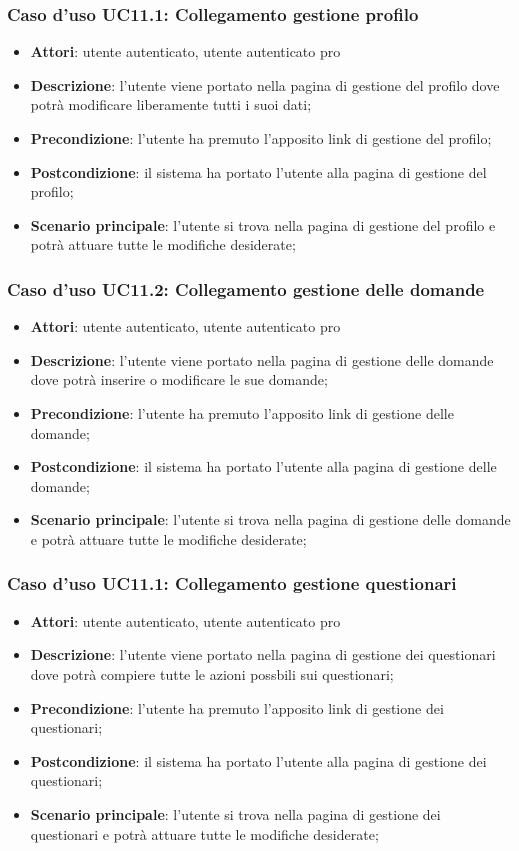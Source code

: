 \subsubsection{Caso d'uso UC11.1: Collegamento gestione profilo}
\begin{itemize}
\item\textbf{Attori}: utente autenticato, utente autenticato pro
\item\textbf{Descrizione}: l'utente viene portato nella pagina di gestione del profilo dove potrà modificare liberamente tutti i suoi dati;
\item\textbf{Precondizione}: l'utente ha premuto l'apposito link di gestione del profilo;
\item\textbf{Postcondizione}: il sistema ha portato l'utente alla pagina di gestione del profilo;
\item\textbf{Scenario principale}: l'utente si trova nella pagina di gestione del profilo e potrà attuare tutte le modifiche desiderate;
\end{itemize}

\subsubsection{Caso d'uso UC11.2: Collegamento gestione delle domande}
\begin{itemize}
\item\textbf{Attori}: utente autenticato, utente autenticato pro
\item\textbf{Descrizione}: l'utente viene portato nella pagina di gestione delle domande dove potrà inserire o modificare le sue domande;
\item\textbf{Precondizione}: l'utente ha premuto l'apposito link di gestione delle domande;
\item\textbf{Postcondizione}: il sistema ha portato l'utente alla pagina di gestione delle domande;
\item\textbf{Scenario principale}: l'utente si trova nella pagina di gestione delle domande e potrà attuare tutte le modifiche desiderate;
\end{itemize}

\subsubsection{Caso d'uso UC11.1: Collegamento gestione questionari}
\begin{itemize}
\item\textbf{Attori}: utente autenticato, utente autenticato pro
\item\textbf{Descrizione}: l'utente viene portato nella pagina di gestione dei questionari dove potrà compiere tutte le azioni possbili sui questionari;
\item\textbf{Precondizione}: l'utente ha premuto l'apposito link di gestione dei questionari;
\item\textbf{Postcondizione}: il sistema ha portato l'utente alla pagina di gestione dei questionari;
\item\textbf{Scenario principale}: l'utente si trova nella pagina di gestione dei questionari e potrà attuare tutte le modifiche desiderate;
\end{itemize}